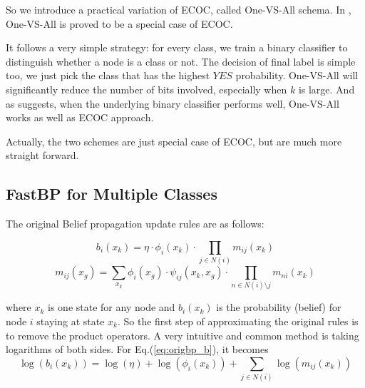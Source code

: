 So we introduce a practical variation of ECOC, called One-VS-All schema. In \cite{Erin2000}, One-VS-All is proved to be a special case of ECOC.

It follows a very simple strategy: for every class, we train a binary classifier to distinguish whether a node is a class or not. The decision of final label is simple too, we just pick the class that has the highest $YES$ probability. One-VS-All will significantly reduce the number of bits involved, especially when $k$ is large. And as \cite{Ryan2000} suggests, when the underlying binary classifier performs well, One-VS-All works as well as ECOC approach.


Actually, the two schemes are just special case of ECOC, but are much more straight forward.


\subsection{FastBP for Multiple Classes}
The original Belief propagation update rules are as follows:

\begin{equation}
\label{eq:origbp_b}
b_i(x_k) = \eta\cdot \phi_i(x_k)\cdot\mathop{\prod}_{j\in N(i)}m_{ij}(x_k)
\end{equation}
\begin{equation}
\label{eq:origbp_m}
m_{ij}(x_g)=\mathop{\sum}_{x_k}\phi_{i}(x_g)\cdot \psi_{ij}(x_k,x_g)\cdot\mathop{\prod}_{n\in N(i)\setminus j} m_{ni}(x_k)
\end{equation}

where $x_k$ is one state for any node and $b_i(x_k)$ is the probability (belief) for node $i$ staying at state $x_k$. So the first step of approximating the original rules is to remove the product operators. A very intuitive and common method is taking logarithms of both sides. For Eq.(\ref{eq:origbp_b}), it becomes
\begin{equation}
\log(b_i(x_k)) = \log(\eta) + \log(\phi_i(x_k)) + \mathop{\sum}_{j\in N(i)}\log(m_{ij}(x_k))
\end{equation}

